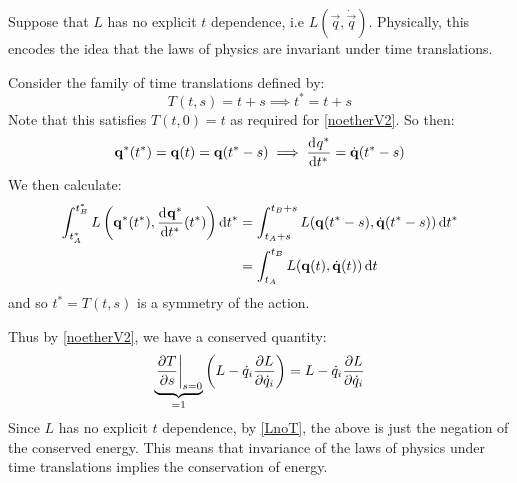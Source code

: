 \documentclass[../main.tex]{subfiles}
\begin{document}
\begin{example}
  Suppose that $L$ has no explicit $t$ dependence, i.e $L(\vec{q}, \dot{\vec{q}})$.
  Physically, this encodes the idea that the laws of physics are invariant under time translations.

  Consider the family of time translations defined by:
  \[
    T(t, s) = t + s \implies t^{*} = t + s
  \]
  Note that this satisfies $T(t, 0) = t$ as required for \cref{noetherV2}.
  So then:
  \[
    \vec{q}^{*}(t^{*}) = \vec{q}(t) = \vec{q}(t^{*} - s) \implies \deriv{q^{*}}{{t^{*}}} = \dot{\vec{q}}(t^{*} - s)
  \]
  We then calculate:
  \begin{align*}
    \int_{t^{*}_A}^{t^{*}_B} L\left(\vec{q}^{*}(t^{*}), \deriv{\vec{q}^{*}}{{t^{*}}}(t^{*})\right) \d{t^{*}} &= \int_{t_A + s}^{t_B + s} L(\vec{q}(t^{*} - s), \dot{\vec{q}}(t^{*} - s)) \d{t^{*}} \\
                                                                                                  &= \int_{t_A}^{t_B} L(\vec{q}(t), \dot{\vec{q}}(t)) \d{t}
  \end{align*}
  and so $t^{*} = T(t, s)$ is a symmetry of the action.

  Thus by \cref{noetherV2}, we have a conserved quantity:
  \[
    \underbrace{\at{\pderiv{T}{s}}{s = 0}}_{= 1}\left(L - \dot{q}_i \pderiv{L}{\dot{q}_i}\right) = L - \dot{q}_i \pderiv{L}{\dot{q}_i}
  \]
  Since $L$ has no explicit $t$ dependence, by \cref{LnoT}, the above is just the negation of the conserved energy.
  This means that invariance of the laws of physics under time translations implies the conservation of energy.
\end{example}
\end{document}
